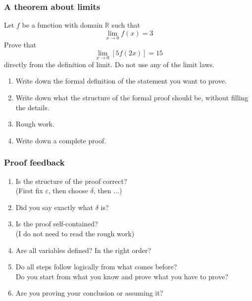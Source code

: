 \documentclass[14pt]{beamer}
\newcommand {\R}{\mathbb{R}}
\newcommand{\e}{\varepsilon}
\newcommand{\setsize}[1]{\fontsize{#1}{#1}\selectfont} %
\newcommand{\smallerfont}{\setsize{13}} %
\begin{document}
\begin{frame}
\frametitle{A theorem about limits}
\smallerfont
\begin{block}{}
 Let $f$ be a function with domain $\R$ such that 
$$
\lim_{x\to 0} f(x) = 3
$$
Prove that 
$$
\lim_{x\to 0} \left[  5 f(2x) \right] =15
$$
directly from the definition of limit.  Do not use any of the limit laws.
\end{block}
\begin{enumerate}
\pause	\item  Write down the formal definition of the statement you want to prove.
\pause	\item  Write down what the structure of the formal proof should be, without filling the details.
\pause	\item  Rough work.
\pause 	\item  Write down a complete proof.
\end{enumerate}

\end{frame}
\begin{frame}[t]
\frametitle{Proof feedback}

\begin{enumerate}
	\item  Is the structure of the proof correct?  \\
	(First fix $\e$, then choose $\delta$, then ...)
	\item  Did you say exactly what $\delta$ is?
	\item  Is the proof self-contained?  \\
	 (I do not need to read the rough work)
	\item  Are all variables defined?  In the right order? 
	\item  Do all steps follow logically from what comes before? \\
	Do you start from what you know and prove what you have to prove? \\
	\item  Are you proving your conclusion or assuming it?
\end{enumerate}


\end{frame}
\end{document}

